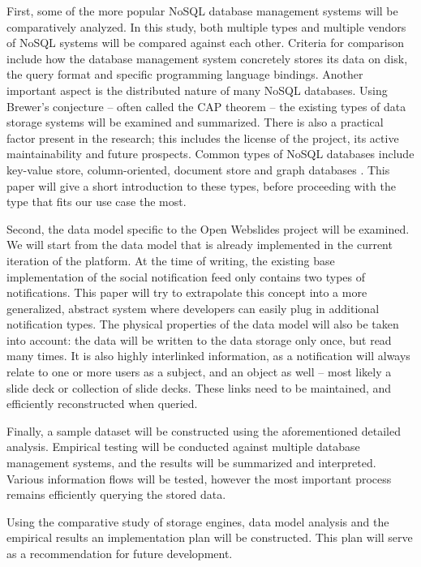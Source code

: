 \documentclass[fleqn,10pt]{voorstel}
\begin{document}
First, some of the more popular NoSQL database management systems will be comparatively analyzed. In this study, both multiple types and multiple vendors of NoSQL systems will be compared against each other. Criteria for comparison include how the database management system concretely stores its data on disk, the query format and specific programming language bindings. Another important aspect is the distributed nature of many NoSQL databases. Using Brewer's conjecture \autocite{Brewer2002} -- often called the CAP theorem -- the existing types of data storage systems will be examined and summarized. There is also a practical factor present in the research; this includes the license of the project, its active maintainability and future prospects.
Common types of NoSQL databases include key-value store, column-oriented, document store and graph databases \autocite{NayakPoriyaPoojary2003}. This paper will give a short introduction to these types, before proceeding with the type that fits our use case the most.

Second, the data model specific to the Open Webslides project will be examined. We will start from the data model that is already implemented in the current iteration of the platform. At the time of writing, the existing base implementation of the social notification feed only contains two types of notifications. This paper will try to extrapolate this concept into a more generalized, abstract system where developers can easily plug in additional notification types.
The physical properties of the data model will also be taken into account: the data will be written to the data storage only once, but read many times. It is also highly interlinked information, as a notification will always relate to one or more users as a subject, and an object as well -- most likely a slide deck or collection of slide decks. These links need to be maintained, and efficiently reconstructed when queried.

Finally, a sample dataset will be constructed using the aforementioned detailed analysis. Empirical testing will be conducted against multiple database management systems, and the results will be summarized and interpreted. Various information flows will be tested, however the most important process remains efficiently querying the stored data.

Using the comparative study of storage engines, data model analysis and the empirical results an implementation plan will be constructed. This plan will serve as a recommendation for future development.
\end{document}
